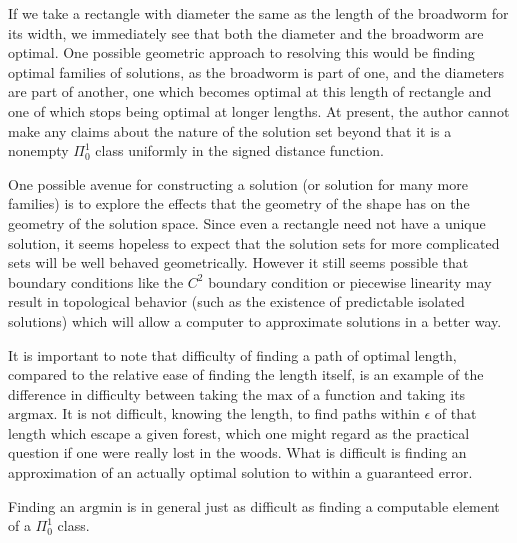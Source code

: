 \documentclass{journal}
\theoremstyle{definition}
\begin{document}
If we take a rectangle with diameter the same as the length of the broadworm for its width, we immediately see that both the diameter and the broadworm are optimal. One possible geometric approach to resolving this would be finding optimal families of solutions, as the broadworm is part of one, and the diameters are part of another, one which becomes optimal at this length of rectangle and one of which stops being optimal at longer lengths. At present, the author cannot make any claims about the nature of the solution set beyond that it is a nonempty $\Pi_0^1$ class uniformly in the signed distance function.

One possible avenue for constructing a solution (or solution for many more families) is to explore the effects that the geometry of the shape has on the geometry of the solution space. Since even a rectangle need not have a unique solution, it seems hopeless to expect that the solution sets for more complicated sets will be well behaved geometrically. However it still seems possible that boundary conditions like the $C^2$ boundary condition or piecewise linearity may result in topological behavior (such as the existence of predictable isolated solutions) which will allow a computer to approximate solutions in a better way.

It is important to note that difficulty of finding a path of optimal length, compared to the relative ease of finding the length itself, is an example of the difference in difficulty between taking the $\mathrm{max}$ of a function and taking its $\mathrm{argmax}$. It is not difficult, knowing the length, to find paths within $\epsilon$ of that length which escape a given forest, which one might regard as the practical question if one were really lost in the woods. What is difficult is finding an approximation of an actually optimal solution to within a guaranteed error.

Finding an $\mathrm{argmin}$ is in general just as difficult as finding a computable element of a $\Pi_0^1$ class.
\end{document}
